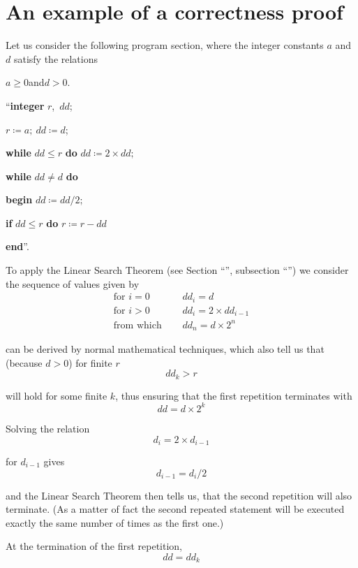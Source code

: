 \section{An example of a correctness proof}

Let us consider the following program section, where the integer constants $a$ and $d$ satisfy the relations
\medskip

{
	\setlength{\parindent}{8em}
	$a \geqslant 0$\quad and\quad $d > 0$.
	
	``\textbf{integer} $r$,\ $dd$;
	
	$r \coloneq a;\ dd \coloneq d$;
	
	\textbf{while} $dd \leqslant r$ \textbf{do} $dd \coloneq 2\times dd;$
	
	\textbf{while} $dd \neq d$ \textbf{do}
	
	\quad \textbf{begin} $dd \coloneq dd/2;$
	
	\quad\quad \textbf{if} $dd \leqslant r$ \textbf{do} $r \coloneq r - dd$
	
	\quad\textbf{end}''.
}
\medskip

To apply the Linear Search Theorem (see Section ``'', subsection ``'') we consider the sequence of values given by
\begin{equation}
	\label{eq:example-initial}
	\begin{split}
		\text{for } i = 0\quad & dd_i = d \\
		\text{for } i > 0\quad & dd_i = 2\times dd_{i - 1}\\
		\text{from which }\quad & dd_n = d\times 2^n
	\end{split}
\end{equation}

\noindent
can be derived by normal mathematical techniques, which also tell us that (because $d > 0$) for finite $r$
$$
dd_k > r
$$

\noindent
will hold for some finite $k$, thus ensuring that the first repetition terminates with
$$
dd = d\times 2^k
$$

Solving the relation
$$
d_i = 2\times d_{i-1}
$$

for $d_{i-1}$ gives
$$
d_{i-1} = d_i/2
$$

\noindent
and the Linear Search Theorem then tells us, that the second repetition will also terminate. (As a matter of fact the second repeated statement will be executed exactly the same number of times as the first one.)

At the termination of the first repetition,
$$
dd=dd_k
$$

